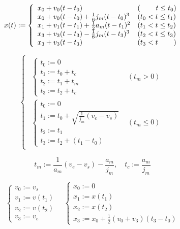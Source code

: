 \documentclass[a5paper]{ltjsarticle}
\begin{document}
$$
    x(t) :=
    \left\{ \begin{array}{ll}
        x_0 + v_0(t-t_0)                           & (\hspace{2.2em} t \le t_0) \\
        x_0 + v_0(t-t_0) + \frac{1}{6}j_m(t-t_0)^3 & (t_0 < t \le t_1)          \\
        x_1 + v_1(t-t_1) + \frac{1}{2}a_m(t-t_1)^2 & (t_1 < t \le t_2)          \\
        x_3 + v_3(t-t_3) - \frac{1}{6}j_m(t-t_3)^3 & (t_2 < t \le t_3)          \\
        x_3 + v_3(t-t_3)                           & (t_3 < t \hspace{2.2em})
    \end{array} \right.
$$

$$
    \left\{ \begin{array}{l}
        \begin{array}{ll}
            \left\{ \begin{array}{l}
                t_0 := 0         \\
                t_1 := t_0 + t_c \\
                t_2 := t_1 + t_m \\
                t_3 := t_2 + t_c
            \end{array} \right.
             &
            (t_m > 0)
            \\
            \left\{ \begin{array}{l}
                t_0 := 0                                   \\
                t_1 := t_0 + \sqrt{\frac{1}{j_m}(v_e-v_s)} \\
                t_2 := t_1                                 \\
                t_3 := t_2 + (t_1-t_0)
            \end{array} \right.
             &
            (t_m \le 0)
        \end{array}
    \end{array} \right.
$$

$$
    t_m := \frac{1}{a_m}(v_e - v_s) - \frac{a_m}{j_m}
    ,\quad
    t_c := \frac{a_m}{j_m}
$$

$$
    \left\{ \begin{array}{l}
        v_0 := v_s    \\
        v_1 := v(t_1) \\
        v_2 := v(t_2) \\
        v_3 := v_e
    \end{array} \right.
    \quad
    \left\{ \begin{array}{l}
        x_0 := 0      \\
        x_1 := x(t_1) \\
        x_2 := x(t_2) \\
        x_3 := x_0 + \frac{1}{2}(v_0 + v_3)(t_3-t_0)
    \end{array} \right.
$$
\end{document}
